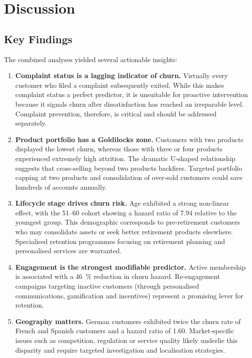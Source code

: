 \documentclass[12pt]{article}
\begin{document}
\section{Discussion}
\subsection{Key Findings}
The combined analyses yielded several actionable insights:

\begin{enumerate}
  \item \textbf{Complaint status is a lagging indicator of churn.}  Virtually every customer who filed a complaint subsequently exited.  While this makes complaint status a perfect predictor, it is unsuitable for proactive intervention because it signals churn after dissatisfaction has reached an irreparable level.  Complaint prevention, therefore, is critical and should be addressed separately.

  \item \textbf{Product portfolio has a Goldilocks zone.}  Customers with two products displayed the lowest churn, whereas those with three or four products experienced extremely high attrition.  The dramatic U‑shaped relationship suggests that cross‑selling beyond two products backfires.  Targeted portfolio capping at two products and consolidation of over‑sold customers could save hundreds of accounts annually.

  \item \textbf{Lifecycle stage drives churn risk.}  Age exhibited a strong non‑linear effect, with the 51–60 cohort showing a hazard ratio of 7.94 relative to the youngest group.  This demographic corresponds to pre‑retirement customers who may consolidate assets or seek better retirement products elsewhere.  Specialised retention programmes focusing on retirement planning and personalised services are warranted.

  \item \textbf{Engagement is the strongest modifiable predictor.}  Active membership is associated with a 46~\% reduction in churn hazard.  Re‑engagement campaigns targeting inactive customers (through personalised communications, gamification and incentives) represent a promising lever for retention.

  \item \textbf{Geography matters.}  German customers exhibited twice the churn rate of French and Spanish customers and a hazard ratio of 1.60.  Market‑specific issues such as competition, regulation or service quality likely underlie this disparity and require targeted investigation and localisation strategies.
\end{enumerate}
\end{document}
